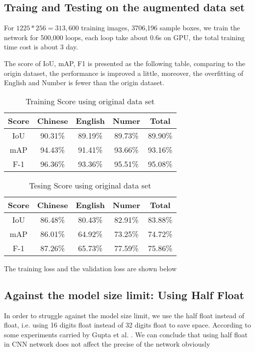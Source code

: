 \documentclass{IEEEtran}
\begin{document}
\subsection{Traing and Testing on the augmented data set}
For $1225*256 = 313,600$ training images, 3706,196 sample boxes, we train the network for 500,000 loops, each loop take about 0.6s on GPU, the total training time cost is about 3 day.

The score of IoU, mAP, F1 is presented as the following table, comparing to the origin dataset, the performance is improved a little, moreover, the overfitting of English and Number is fewer than the origin dataset. 

\begin{table}[h]
    \centering\caption{Training Score using original data set}
    \begin{tabular}{ccccc}
        \toprule
        Score & Chinese  & English & Numer & Total \\
        \midrule
        IoU & 90.31\% & 89.19\% & 89.73\% & 89.90\%\\
        mAP & 94.43\% & 91.41\% & 93.66\% & 93.16\%\\
        F-1 & 96.36\% & 93.36\% & 95.51\% & 95.08\%\\
        \bottomrule
    \end{tabular}
\end{table}
\begin{table}[h]
    \centering\caption{Tesing Score using original data set}
    \begin{tabular}{ccccc}
        \toprule
        Score & Chinese  & English & Numer & Total \\
        \midrule
        IoU & 86.48\% & 80.43\% & 82.91\% & 83.88\%\\
        mAP & 86.01\% & 64.92\% & 73.25\% & 74.72\%\\
        F-1 & 87.26\% & 65.73\% & 77.59\% & 75.86\%\\
        \bottomrule
    \end{tabular}
\end{table}

The training loss and the validation loss are shown below

\subsection{Against the model size limit: Using Half Float}

In order to struggle against the model size limit, we use the half float instead of float, i.e. using 16 digits float
instead of 32 digits float to save space. According to some experiments carried by Gupta et al. \cite{halffloat}. 
We can conclude that using half float in CNN network does not affect the precise of the network obviously
\end{document}
